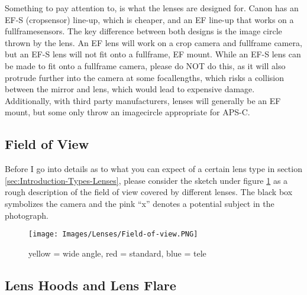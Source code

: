 Something to pay attention to, is what the lenses are designed for. Canon has an \gls{EF-S} (\gls{cropsensor}) line-up, which is cheaper, and an \gls{EF} line-up that works on a \glspl{fullframesensor}. The key difference between both designs is the image circle thrown by the lens. An \gls{EF} lens will work on a \gls{crop} camera and \gls{fullframe} camera, but an \gls{EF-S} lens will not fit onto a \gls{fullframe}, \gls{EF} mount. While an \gls{EF-S} lens can be made to fit onto a \gls{fullframe} camera, please do NOT do this, as it will also protrude further into the camera at some \glspl{focallength}, which risks a collision between the mirror and lens, which would lead to expensive damage.
\\[\baselineskip]
Additionally, with third party manufacturers, lenses will generally be an \gls{EF} mount, but some only throw an \gls{imagecircle} appropriate for \gls{APS-C}.

\subsection{Field of View}
\label{subsec:Field-of-View}

Before I go into details as to what you can expect of a certain lens type in section \ref{sec:Introduction-Types-Lenses}, please consider the sketch under figure \ref{fig:Field-of-view} as a rough description of the field of view covered by different lenses. The black box symbolizes the camera and the pink ``x'' denotes a potential subject in the photograph.

\begin{figure}[htb]
	\centering
		\texttt{[image: Images/Lenses/Field-of-view.PNG]}
	\caption{yellow = wide angle, red = standard, blue = tele}
	\label{fig:Field-of-view}
\end{figure}


\subsection{Lens Hoods and Lens Flare}

